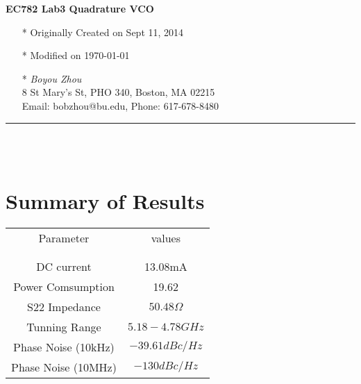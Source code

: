 \documentclass[]{article}
\begin{document}
\pagestyle{empty}
{\large\textbf{EC782 Lab3 Quadrature VCO}}


    \begin{itemize}
        \item[*] Originally Created on Sept 11, 2014
        \item[*] Modified on \today
        \item[*] \textit {Boyou Zhou}\\
                 8 St Mary's St, PHO 340, Boston, MA 02215\\
                 Email: bobzhou@bu.edu, Phone: 617-678-8480
                    
    \end{itemize}

%


\rule[-0.1cm]{7.5in}{0.01cm}\\
\\
\indent		             
\section {Summary of Results}

\begin{center}
    \begin{tabular}{c c}
        Parameter & values \\ \\ \hline \\
        DC current & 13.08mA \\
        Power Comsumption & 19.62 \\
        S22 Impedance & $50.48\Omega$ \\
        Tunning Range & $5.18 - 4.78 GHz$ \\
        Phase Noise (10kHz) & $-39.61dBc/Hz$ \\
        Phase Noise (10MHz) & $-130dBc/Hz$


    \end{tabular}
\end{center}
\end{document}
